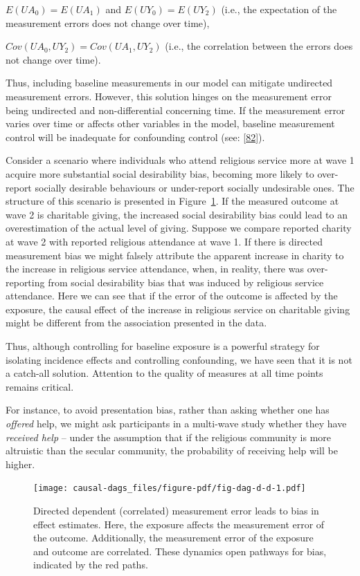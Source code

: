 \documentclass[
  singlecolumn]{article}
\begin{document}
\(E(UA_0) = E(UA_1)\) and \(E(UY_0) = E(UY_2)\) (i.e., the expectation
of the measurement errors does not change over time),

\(Cov(UA_0, UY_2) = Cov(UA_1, UY_2)\) (i.e., the correlation between the
errors does not change over time).

Thus, including baseline measurements in our model can mitigate
undirected measurement errors. However, this solution hinges on the
measurement error being undirected and non-differential concerning time.
If the measurement error varies over time or affects other variables in
the model, baseline measurement control will be inadequate for
confounding control (see: {[}\protect\hyperlink{ref-keogh2020}{82}{]}).

Consider a scenario where individuals who attend religious service more
at wave 1 acquire more substantial social desirability bias, becoming
more likely to over-report socially desirable behaviours or under-report
socially undesirable ones. The structure of this scenario is presented
in Figure~\ref{fig-dag-d-d}. If the measured outcome at wave 2 is
charitable giving, the increased social desirability bias could lead to
an overestimation of the actual level of giving. Suppose we compare
reported charity at wave 2 with reported religious attendance at wave 1.
If there is directed measurement bias we might falsely attribute the
apparent increase in charity to the increase in religious service
attendance, when, in reality, there was over-reporting from social
desirability bias that was induced by religious service attendance. Here
we can see that if the error of the outcome is affected by the exposure,
the causal effect of the increase in religious service on charitable
giving might be different from the association presented in the data.

Thus, although controlling for baseline exposure is a powerful strategy
for isolating incidence effects and controlling confounding, we have
seen that it is not a catch-all solution. Attention to the quality of
measures at all time points remains critical.

For instance, to avoid presentation bias, rather than asking whether one
has \emph{offered} help, we might ask participants in a multi-wave study
whether they have \emph{received help} -- under the assumption that if
the religious community is more altruistic than the secular community,
the probability of receiving help will be higher.

\begin{figure}

{\centering \texttt{[image: causal-dags\_files/figure-pdf/fig-dag-d-d-1.pdf]}

}

\caption{\label{fig-dag-d-d}Directed dependent (correlated) measurement
error leads to bias in effect estimates. Here, the exposure affects the
measurement error of the outcome. Additionally, the measurement error of
the exposure and outcome are correlated. These dynamics open pathways
for bias, indicated by the red paths.}

\end{figure}
\end{document}
